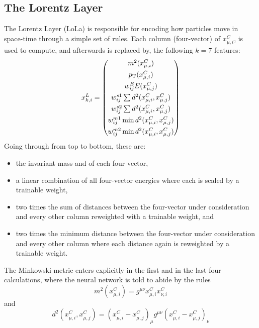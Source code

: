 \subsection{The Lorentz Layer}
The Lorentz Layer (LoLa) is responsible for encoding how particles move in space-time through a simple set of rules. Each column (four-vector) of $x_{\mu,i}^{C}$, is used to compute, and afterwards is replaced by, the following $k=7$ features:
\begin{equation}
  \label{eq:lola:lola}
  x_{k,i}^{L} = \begin{pmatrix}
  m^2  (x_{\mu,i}^{C})                       \\[1ex]
  p_{\mathrm{T}}  (x_{\mu,i}^{C})                       \\[1ex]
  w^E_{ij} E(x_{\mu,j}^{C})                       \\[1ex]
  w^{s1}_{ij}\sum d^2(x_{\mu,i}^{C},x_{\mu,j}^{C}) \\[1ex]
  w^{s2}_{ij}\sum d^2(x_{\mu,i}^{C},x_{\mu,j}^{C}) \\[1ex]
  w^{m1}_{ij}\min d^2(x_{\mu,i}^{C},x_{\mu,j}^{C}) \\[1ex]
  w^{m2}_{ij}\min d^2(x_{\mu,i}^{C},x_{\mu,j}^{C}) 
  \end{pmatrix}
\end{equation}
Going through from top to bottom, these are:
\begin{itemize}
  \itemsep0em 
  \item the invariant mass and \PT of each four-vector, 
  \item a linear combination of all four-vector energies where each is scaled by a trainable weight,
  \item two times the sum of distances between the four-vector under consideration and every other column reweighted with a trainable weight, and
  \item two times the minimum distance between the four-vector under consideration and every other column where each distance again is reweighted by a trainable weight.
 \end{itemize}
  The Minkowski metric enters explicitly in the first and in the last four calculations, where the neural network is told to abide by the rules
\begin{equation}
  m^2 (x_{\mu,i}^{C}) = g^{\mu\nu}x_{\mu,i}^{C}x_{\nu,i}^{C}
\end{equation}
and
\begin{equation}
  d^2 (x_{\mu,i}^{C},x_{\mu,j}^{C}) = (x_{\mu,i}^{C}-x_{\mu,j}^{C})_{\mu} g^{\mu\nu} (x_{\mu,i}^{C}-x_{\mu,j}^{C})_{\nu}
\end{equation}
